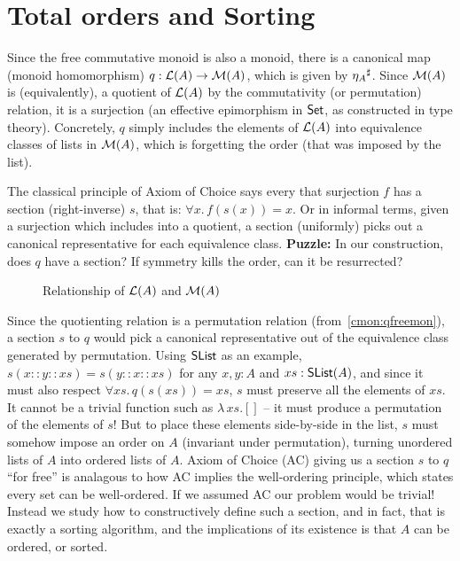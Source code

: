 \section{Total orders and Sorting}
\label{sec:sorting}

Since the free commutative monoid is also a monoid, there is a canonical map (monoid homomorphism)
$q : \mathcal{L}(A) \to \mathcal{M}(A)$, which is given by ${\eta_A}^{\sharp}$.
%
Since $\mathcal{M}(A)$ is (equivalently), a quotient of $\mathcal{L}(A)$ by the commutativity (or permutation) relation,
it is a surjection (an effective epimorphism in $\mathsf{Set}$, as constructed in type theory).
%
Concretely, $q$ simply includes the elements of $\mathcal{L}(A)$ into equivalence classes of lists in $\mathcal{M}(A)$,
which is forgetting the order (that was imposed by the list).

The classical principle of Axiom of Choice says every that surjection $f$ has a section (right-inverse) $s$, that is:
$\forall x.\, f(s(x)) = x$. Or in informal terms, given a surjection which includes into a quotient, a section
(uniformly) picks out a canonical representative for each equivalence class.
%
\textbf{Puzzle:} In our construction, does $q$ have a section? If symmetry kills the order, can it be resurrected?

\begin{figure}[H]
    \centering
    \caption{Relationship of $\mathcal{L}(A)$ and $\mathcal{M}(A)$}
    \label{fig:enter-label}
\end{figure}

Since the quotienting relation is a permutation relation (from~\cref{cmon:qfreemon}), a section $s$ to $q$ would pick a
canonical representative out of the equivalence class generated by permutation.
%
Using $\operatorname{\mathsf{SList}}$ as an example, $s(x :: y :: xs) = s(y :: x :: xs)$ for any $x, y : A$ and $xs : \operatorname{\mathsf{SList}}(A)$,
and since it must also respect $\forall xs.\,q(s(xs)) = xs$, $s$ must preserve all the elements of $xs$.
It cannot be a trivial function such as $\lambda\,xs. []$ -- it must produce a permutation of the elements of $s$!
%
But to place these elements side-by-side in the list, $s$ must somehow impose an order on $A$
(invariant under permutation), turning unordered lists of $A$ into ordered lists of $A$.
%
Axiom of Choice (AC) giving us a section $s$ to $q$ ``for free'' is analagous to how
AC implies the well-ordering principle, which states every set can be well-ordered.
%
If we assumed AC our problem would be trivial!
%
Instead we study how to constructively define such a section, and in fact, that is exactly a sorting algorithm,
and the implications of its existence is that $A$ can be ordered, or sorted.

